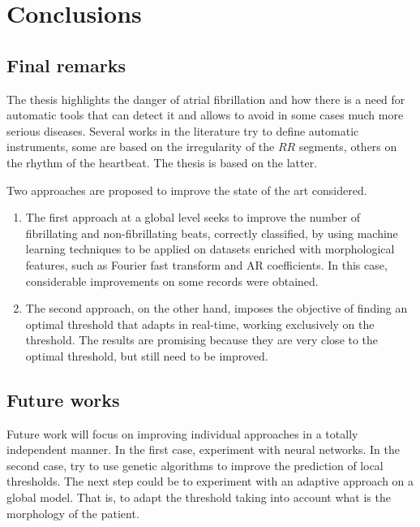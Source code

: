 \chapter{Conclusions} 

\section{Final remarks}
The thesis highlights the danger of atrial fibrillation and how there is a need for automatic tools that can detect it and allows to avoid in some cases much more serious diseases. 
Several works in the literature try to define automatic instruments, some are based on the irregularity of the $RR$ segments, others on the rhythm of the heartbeat. The thesis is based on the latter.

Two approaches are proposed to improve the state of the art considered.
\begin{enumerate}
\item The first approach at a global level seeks to improve the number of fibrillating and non-fibrillating beats, correctly classified, by using machine learning techniques to be applied on datasets enriched with morphological features, such as Fourier fast transform and AR coefficients.
In this case, considerable improvements on some records were obtained.
\item The second approach, on the other hand, imposes the objective of finding an optimal threshold that adapts in real-time, working exclusively on the threshold.
The results are promising because they are very close to the optimal threshold, but still need to be improved.
\end{enumerate}

\section{Future works}
Future work will focus on improving individual approaches in a totally independent manner. In the first case, experiment with neural networks. In the second case, try to use genetic algorithms to improve the prediction of local thresholds.
The next step could be to experiment with an adaptive approach on a global model. That is, to adapt the threshold taking into account what is the morphology of the patient.